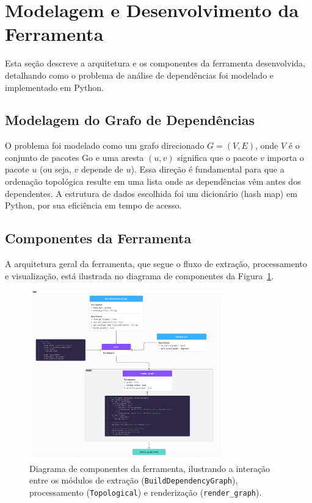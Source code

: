 \documentclass[12pt]{article}
\begin{document}
\section{Modelagem e Desenvolvimento da Ferramenta}
Esta seção descreve a arquitetura e os componentes da ferramenta desenvolvida, detalhando como o problema de análise de dependências foi modelado e implementado em Python.

\subsection{Modelagem do Grafo de Dependências}
O problema foi modelado como um grafo direcionado $G = (V, E)$, onde $V$ é o conjunto de pacotes Go e uma aresta $(u, v)$ significa que o pacote $v$ importa o pacote $u$ (ou seja, $v$ depende de $u$). Essa direção é fundamental para que a ordenação topológica resulte em uma lista onde as dependências vêm antes dos dependentes. A estrutura de dados escolhida foi um dicionário (hash map) em Python, por sua eficiência em tempo de acesso.

\subsection{Componentes da Ferramenta}
A arquitetura geral da ferramenta, que segue o fluxo de extração, processamento e visualização, está ilustrada no diagrama de componentes da Figura~\ref{fig:diagrama-classes}.

\begin{figure}[htbp]
    \centering
    \includegraphics[width=0.75\textwidth]{images/diagrama_classes.png}
    \caption{Diagrama de componentes da ferramenta, ilustrando a interação entre os módulos de extração (\texttt{BuildDependencyGraph}), processamento (\texttt{Topological}) e renderização (\texttt{render\_graph}).}
    \label{fig:diagrama-classes}
\end{figure}
\end{document}
